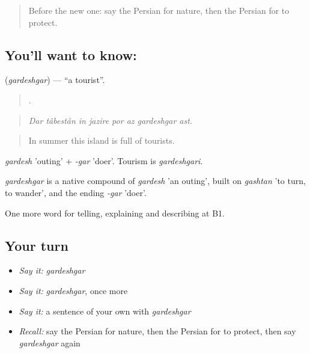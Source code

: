 \label{lesson:FA-C472-gardeshgar}



\begin{quote}
Before the new one: say the Persian for nature, then the Persian for to protect.
\end{quote}

\subsection*{You'll want to know: }
\textbf{} (\emph{gardeshgar}) — \textquotedblleft{}a tourist\textquotedblright{}.

\begin{quote}
       .
\end{quote}

\begin{quote}
\emph{Dar tâbestân in jazire por az gardeshgar ast.}
\end{quote}

\begin{quote}
In summer this island is full of tourists.
\end{quote}

\emph{gardesh} 'outing' + \emph{-gar} 'doer'. Tourism is \emph{gardeshgari}.

\begin{cousinweb}
\emph{gardeshgar} is a native compound of \emph{gardesh} 'an outing', built on \emph{gashtan} 'to turn, to wander', and the ending \emph{-gar} 'doer'.
\end{cousinweb}

\begin{grammarlens}[title={What you've built}]
One more word for telling, explaining and describing at B1.
\end{grammarlens}

\subsection*{Your turn}
\begin{itemize}
\raggedright
  \item \emph{Say it:} \emph{gardeshgar}
  \item \emph{Say it:} \emph{gardeshgar}, once more
  \item \emph{Say it:} a sentence of your own with \emph{gardeshgar}
  \item \emph{Recall:} say the Persian for nature, then the Persian for to protect, then say \emph{gardeshgar} again
\end{itemize}

